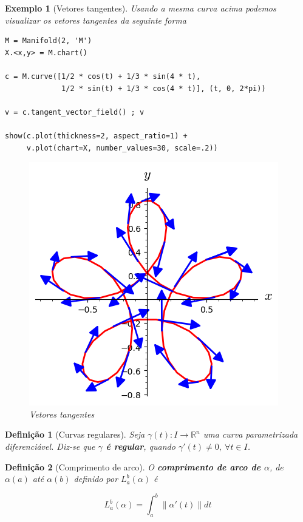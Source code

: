 \documentclass[12pt]{article}
\newtheorem{ex}{Exemplo}[section]
\newtheorem{definition}{Definição}
\begin{document}
\begin{ex}[Vetores tangentes] Usando a mesma curva acima podemos visualizar os vetores tangentes da seguinte forma
\begin{lstlisting}
M = Manifold(2, 'M')
X.<x,y> = M.chart()

c = M.curve([1/2 * cos(t) + 1/3 * sin(4 * t), 
             1/2 * sin(t) + 1/3 * cos(4 * t)], (t, 0, 2*pi))

v = c.tangent_vector_field() ; v

show(c.plot(thickness=2, aspect_ratio=1) +
     v.plot(chart=X, number_values=30, scale=.2))
\end{lstlisting}

\begin{figure}[H]
    \centering
    \includegraphics[scale=.6]{Images/ex1.2.png}
    \caption{Vetores tangentes}
    \label{fig:ex1.2}
\end{figure}

\end{ex}

\begin{definition}[Curvas regulares]
Seja $\gamma (t): I \rightarrow \mathbb{R}^n$ uma curva parametrizada diferenciável. Diz-se que \textbf{$\gamma$ é regular}, quando $\gamma'(t) \neq 0,\ \forall t \in I$.
\end{definition}

\begin{definition}[Comprimento de arco]
O \textbf{comprimento de arco de $\alpha$}, de $\alpha(a)$ até $\alpha(b)$ definido por $L_a^b (\alpha)$ é  

$$L_a^b (\alpha) = \int_a^b \| \alpha'(t) \| d t$$
\end{definition}
\end{document}
